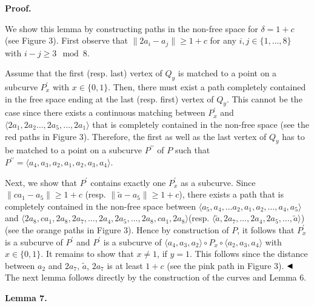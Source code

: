 \documentclass[10pt,a4paper]{article}
\begin{document}
\par\medskip\noindent\textbf{Proof.}\par
We show this lemma by constructing paths in the non-free space for $\delta=1+c$ (see Figure 3). First observe that $\|2a_{i}-a_{j}\|\geq 1+c$ for any $i,j\in\{1,\dots,8\}$ with ${i-j\geq 3\mod 8}$.
\par
\par
Assume that the first (resp. last) vertex of $Q_{y}$ is matched to a point on a subcurve $P^{\prime}_{x}$ with $x\in\{0,1\}$. Then, there must exist a path completely contained in the free space ending at the last (resp. first) vertex of $Q_{y}$. This cannot be the case since there exists a continuous matching between $P^{\prime}_{x}$ and $\langle 2a_{1},2a_{2}\dots,2a_{5},\dots,2a_{1}\rangle$ that is completely contained in the non-free space (see the red paths in Figure 3). Therefore, the first as well as the last vertex of $Q_{y}$ has to be matched to a point on a subcurve $P^{\prime\prime}$ of $P$ such that $P^{\prime\prime}=\langle a_{4},a_{3},a_{2},a_{1},a_{2},a_{3},a_{4}\rangle$.
\par
\par
Next, we show that $P^{\prime}$ contains exactly one $P^{\prime}_{x}$ as a subcurve. Since $\|ca_{1}-a_{5}\|\geq 1+c$ (resp. $\|\tilde{a}-a_{5}\|\geq 1+c$), there exists a path that is completely contained in the non-free space between $\langle a_{5},a_{4},\dots a_{2},a_{1},a_{2},\dots,a_{4},a_{5}\rangle$ and $\langle 2a_{8},ca_{1},2a_{8},2a_{7},\dots,2a_{4},2a_{5},\dots,2a_{8},ca_{1},2a%
_{8}\rangle$(resp. $\langle\tilde{a},2a_{7},\dots,2a_{4},2a_{5},\dots,\tilde{a}\rangle$) (see the orange paths in Figure 3). Hence by construction of $P$, it follows that $P^{\prime}_{x}$ is a subcurve of $P^{\prime}$ and $P^{\prime}$ is a subcurve of $\langle a_{4},a_{3},a_{2}\rangle\circ P_{x}\circ\langle a_{2},a_{3},a_{4}\rangle$ with $x\in\{0,1\}$. It remains to show that $x\neq 1$, if $y=1$. This follows since the distance between $a_{2}$ and $2a_{7}$, $\tilde{a}$, $2a_{7}$ is at least $1+c$ (see the pink path in Figure 3). $\hfill\blacktriangleleft$ The next lemma follows directly by the construction of the curves and Lemma 6.
\par
\par
\par\medskip\noindent\textbf{Lemma 7.}\par
\end{document}
